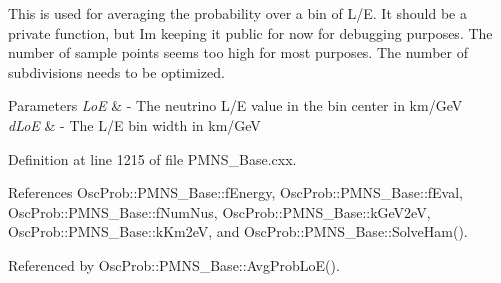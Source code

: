 This is used for averaging the probability over a bin of L/E. It should be a private function, but I\textquotesingle{}m keeping it public for now for debugging purposes. The number of sample points seems too high for most purposes. The number of subdivisions needs to be optimized.


\begin{DoxyParams}{Parameters}
{\em LoE} & -\/ The neutrino L/E value in the bin center in km/\+GeV \\
\hline
{\em d\+LoE} & -\/ The L/E bin width in km/\+GeV \\
\hline
\end{DoxyParams}


Definition at line 1215 of file P\+M\+N\+S\+\_\+\+Base.\+cxx.



References Osc\+Prob\+::\+P\+M\+N\+S\+\_\+\+Base\+::f\+Energy, Osc\+Prob\+::\+P\+M\+N\+S\+\_\+\+Base\+::f\+Eval, Osc\+Prob\+::\+P\+M\+N\+S\+\_\+\+Base\+::f\+Num\+Nus, Osc\+Prob\+::\+P\+M\+N\+S\+\_\+\+Base\+::k\+Ge\+V2eV, Osc\+Prob\+::\+P\+M\+N\+S\+\_\+\+Base\+::k\+Km2eV, and Osc\+Prob\+::\+P\+M\+N\+S\+\_\+\+Base\+::\+Solve\+Ham().



Referenced by Osc\+Prob\+::\+P\+M\+N\+S\+\_\+\+Base\+::\+Avg\+Prob\+Lo\+E().


